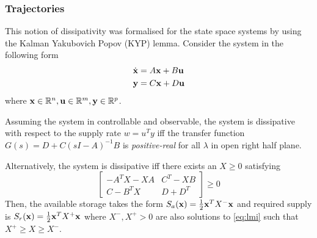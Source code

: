 \subsubsection{Trajectories}
This notion of dissipativity was formalised for the state space systems by using the Kalman Yakubovich Popov (KYP) lemma. Consider the system in the following form
\begin{equation}
\label{eq:ssr}
\begin{aligned}
\dot{\bmx} &= A \bmx + B \bmu\\
\bmy &= C \bmx + D \bmu
\end{aligned}
\end{equation}
where $\mathbf{x}\in\mathbb{R}^n, \mathbf{u}\in\mathbb{R}^m, \mathbf{y}\in\mathbb{R}^p$.

\begin{definition}
Assuming the system in controllable and observable, the system is dissipative with respect to the supply rate $w = u^T y$ iff the transfer function $G(s) = D + C(sI - A)^{-1}B$ is \emph{positive-real} for all $\lambda$ in open right half plane.

Alternatively, the system is dissipative iff there exists an $X\geq 0$ satisfying
\begin{equation}
\begin{bmatrix} -A^T X - XA& C^T - XB\\ C - B^T X& D + D^T\end{bmatrix} \geq 0 \label{eq:lmi}
\end{equation}
Then, the available storage takes the form $S_a(\mathbf{x}) = \tfrac{1}{2}\mathbf{x}^T X^- \mathbf{x}$ and required supply is $S_r(\mathbf{x}) = \tfrac{1}{2}\mathbf{x}^T X^+ \mathbf{x}$ where $X^-, X^+  > 0$ are also solutions to \ref{eq:lmi} such that $X^+ \geq X \geq X^-$.
\end{definition}